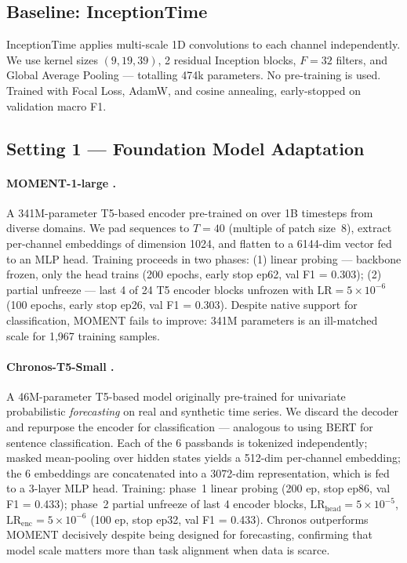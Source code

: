 \documentclass{article}
\begin{document}
\subsection{Baseline: InceptionTime}

InceptionTime \citep{inception} applies multi-scale 1D convolutions to each
channel independently. We use kernel sizes $(9,19,39)$, 2 residual Inception
blocks, $F{=}32$ filters, and Global Average Pooling — totalling 474k
parameters. No pre-training is used. Trained with Focal Loss, AdamW, and
cosine annealing, early-stopped on validation macro F1.

\subsection{Setting 1 — Foundation Model Adaptation}

\paragraph{MOMENT-1-large \citep{moment}.}
A 341M-parameter T5-based encoder pre-trained on over 1B timesteps from
diverse domains. We pad sequences to $T{=}40$ (multiple of patch size~8),
extract per-channel embeddings of dimension 1024, and flatten to a 6144-dim
vector fed to an MLP head. Training proceeds in two phases: (1) linear
probing — backbone frozen, only the head trains (200 epochs, early stop
ep62, val F1 = 0.303); (2) partial unfreeze — last 4 of 24 T5 encoder blocks
unfrozen with $\text{LR}{=}5{\times}10^{-6}$ (100 epochs, early stop ep26,
val F1 = 0.303). Despite native support for classification, MOMENT fails to
improve: 341M parameters is an ill-matched scale for 1,967 training samples.

\paragraph{Chronos-T5-Small \citep{chronos}.}
A 46M-parameter T5-based model originally pre-trained for univariate
probabilistic \emph{forecasting} on real and synthetic time series. We discard
the decoder and repurpose the encoder for classification — analogous to using
BERT for sentence classification. Each of the 6 passbands is tokenized
independently; masked mean-pooling over hidden states yields a 512-dim
per-channel embedding; the 6 embeddings are concatenated into a 3072-dim
representation, which is fed to a 3-layer MLP head.
Training: phase~1 linear probing (200 ep, stop ep86, val F1 = 0.433);
phase~2 partial unfreeze of last 4 encoder blocks,
$\text{LR}_\text{head}{=}5{\times}10^{-5}$,
$\text{LR}_\text{enc}{=}5{\times}10^{-6}$ (100 ep, stop ep32, val F1 = 0.433).
Chronos outperforms MOMENT decisively despite being designed for forecasting,
confirming that model scale matters more than task alignment when data is scarce.
\end{document}
